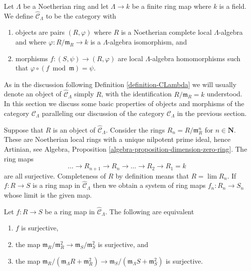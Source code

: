 \begin{definition}
\label{definition-completion-CLambda}
Let $\Lambda$ be a Noetherian ring and let $\Lambda \to k$ be a finite
ring map where $k$ is a field. We define {\it $\widehat{\mathcal{C}}_\Lambda$}
to be the category with
\begin{enumerate}
\item objects are pairs $(R, \varphi)$ where $R$ is a Noetherian complete
local $\Lambda$-algebra and where $\varphi : R/\mathfrak m_R \to k$ is a
$\Lambda$-algebra isomorphism, and
\item morphisms $f : (S, \psi) \to (R, \varphi)$ are local $\Lambda$-algebra
homomorphisms such that $\varphi \circ (f \bmod \mathfrak m) = \psi$.
\end{enumerate}
\end{definition}

\noindent
As in the discussion following
Definition \ref{definition-CLambda}
we will usually denote an object of $\widehat{\mathcal{C}}_\Lambda$
simply $R$, with the identification $R/\mathfrak m_R = k$ understood.
In this section we discuss some basic properties of objects and morphisms
of the category $\widehat{\mathcal{C}}_\Lambda$ paralleling our discussion of
the category $\mathcal{C}_\Lambda$ in the previous section.

\medskip\noindent
Suppose that $R$ is an object of $\widehat{\mathcal{C}}_\Lambda$.
Consider the rings $R_n = R/\mathfrak m_R^n$ for $n \in \mathbf{N}$.
These are Noetherian local rings with a unique nilpotent prime ideal, hence
Artinian, see
Algebra, Proposition \ref{algebra-proposition-dimension-zero-ring}.
The ring maps
$$
\ldots \to R_{n + 1} \to R_n \to \ldots \to R_2 \to R_1 = k
$$
are all surjective. Completeness of $R$ by definition means
that $R = \lim R_n$. If $f : R \to S$ is a ring map in
$\widehat{\mathcal{C}}_\Lambda$ then we obtain a system of ring maps
$f_n : R_n \to S_n$ whose limit is the given map.

\begin{lemma}
\label{lemma-surjective-cotangent-space}
Let $f: R \to S$ be a ring map in $\widehat{\mathcal{C}}_\Lambda$.
The following are equivalent
\begin{enumerate}
\item $f$ is surjective,
\item the map
$\mathfrak m_R/\mathfrak m_R^2 \to \mathfrak m_S/\mathfrak m_S^2$
is surjective, and
\item the map
$\mathfrak m_R/(\mathfrak m_\Lambda R + \mathfrak m_R^2) \to
\mathfrak m_S/(\mathfrak m_\Lambda S + \mathfrak m_S^2)$
is surjective.
\end{enumerate}
\end{lemma}

